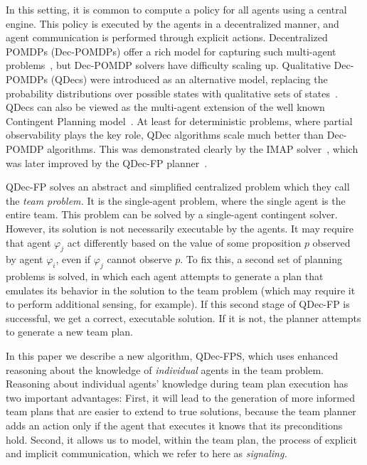 \documentclass[letterpaper]{article}
\theoremstyle{definition}
\begin{document}
In this setting, it is common to compute a policy for all agents %
using a central engine.
This policy is executed by the agents in a decentralized manner, and agent communication is performed through explicit actions. Decentralized POMDPs (Dec-POMDPs) offer a rich model for capturing such multi-agent problems~\citep{Bernstein02,OliehoekA16}, but Dec-POMDP solvers have difficulty scaling up.  Qualitative Dec-POMDPs (QDecs) were introduced as an alternative model, replacing the
probability distributions over possible states with qualitative sets of states~\citep{BrafmanSZ13}.
QDecs can also be viewed as the multi-agent extension of the well known Contingent Planning model~\citep{hoffmann2005contingent}.
At least for deterministic problems, where partial observability plays the key role, QDec algorithms scale much better than Dec-POMDP algorithms.
This was demonstrated clearly by the IMAP solver~\citep{IMAP}, which was later improved
by the QDec-FP planner~\citep{ShekharBS19}.

QDec-FP solves an abstract and simplified centralized problem which they call the {\em team problem.}
It is the single-agent problem, where the single agent is the entire team. This problem can be solved by a single-agent contingent solver.
However, its solution
is not necessarily executable by the agents. It may require that agent $\varphi_j$ act differently based on the value of some proposition $p$ observed by agent $\varphi_i$, even if $\varphi_j$ cannot observe $p$.
To fix this, a second set of planning problems is solved, in which each agent attempts to generate a plan that emulates its behavior in the solution to the team problem (which may require it to perform additional sensing, for example).
If this  second stage of QDec-FP is successful, we get a correct, executable solution. If it is not, the planner attempts to generate a new team plan.

In this paper we describe a new algorithm, QDec-FPS, which uses enhanced reasoning about the  knowledge of {\em individual} agents in the team problem.
Reasoning about individual agents' knowledge
during team plan execution has two important advantages: First, it will lead to the generation of more informed team plans that are easier to extend to true solutions, because the team planner adds an action only if the agent that executes it knows that its preconditions hold.
Second, it allows us to model, within the team plan, the process of explicit and implicit communication, which we refer to here as {\em signaling.}
\end{document}
